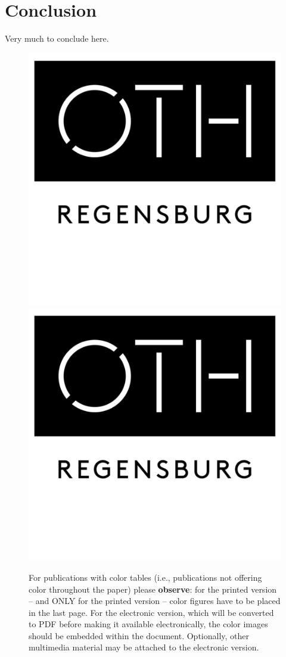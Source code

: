 

\section{Conclusion}

Very much to conclude here.

\newpage

\begin{figure}[tbp]
  \centering
  \mbox{} \hfill
  \includegraphics[width=.3\linewidth]{oth.png}
  \hfill
  \includegraphics[width=.3\linewidth]{oth.png}
  \hfill \mbox{}
  \caption{\label{fig:ex3}%
           For publications with color tables (i.e., publications not offering
           color throughout the paper) please \textbf{observe}:
           for the printed version -- and ONLY for the printed
           version -- color figures have to be placed in the last page.
           \newline
           For the electronic version, which will be converted to PDF before
           making it available electronically, the color images should be
           embedded within the document. Optionally, other multimedia
           material may be attached to the electronic version. }
\end{figure}
